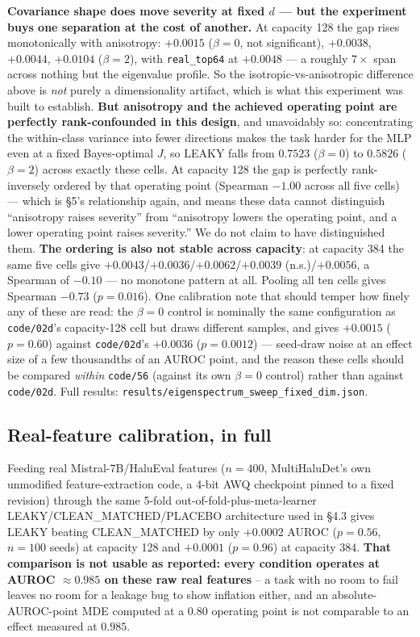 \documentclass[10pt]{article} %
\begin{document}
\textbf{Covariance shape does move severity at fixed $d$ --- but the
experiment buys one separation at the cost of another.} At capacity 128 the
gap rises monotonically with anisotropy: $+0.0015$ ($\beta=0$, not
significant), $+0.0038$, $+0.0044$, $+0.0104$ ($\beta=2$), with
\texttt{real\_top64} at $+0.0048$ --- a roughly $7\times$ span across
nothing but the eigenvalue profile. So the isotropic-vs-anisotropic difference
above is \emph{not} purely a dimensionality artifact, which is what this
experiment was built to establish. \textbf{But anisotropy and the achieved
operating point are perfectly rank-confounded in this design}, and unavoidably
so: concentrating the within-class variance into fewer directions makes the
task harder for the MLP even at a fixed Bayes-optimal $J$, so LEAKY falls from
$0.7523$ ($\beta=0$) to $0.5826$ ($\beta=2$) across exactly these cells. At
capacity 128 the gap is perfectly rank-inversely ordered by that operating
point (Spearman $-1.00$ across all five cells) --- which is §5's relationship
again, and means these data cannot distinguish ``anisotropy raises severity''
from ``anisotropy lowers the operating point, and a lower operating point
raises severity.'' We do not claim to have distinguished them. \textbf{The
ordering is also not stable across capacity}: at capacity 384 the same five
cells give $+0.0043$/$+0.0036$/$+0.0062$/$+0.0039$ (n.s.)/$+0.0056$, a Spearman
of $-0.10$ --- no monotone pattern at all. Pooling all ten cells gives Spearman
$-0.73$ ($p=0.016$). One calibration note that should temper how finely any of
these are read: the $\beta=0$ control is nominally the same configuration as
\texttt{code/02d}'s capacity-128 cell but draws different samples, and gives
$+0.0015$ ($p=0.60$) against \texttt{code/02d}'s $+0.0036$ ($p=0.0012$) --- seed-draw
noise at an effect size of a few thousandths of an AUROC point, and the reason
these cells should be compared \emph{within} \texttt{code/56} (against its own
$\beta=0$ control) rather than against \texttt{code/02d}. Full results:
\texttt{results/eigenspectrum\_sweep\_fixed\_dim.json}.

\subsection{Real-feature calibration, in full}

Feeding real Mistral-7B/HaluEval features ($n=400$, MultiHaluDet's own
unmodified feature-extraction code, a 4-bit AWQ checkpoint pinned to a fixed
revision) through the same 5-fold out-of-fold-plus-meta-learner
LEAKY/CLEAN\_MATCHED/PLACEBO architecture used in §4.3 gives LEAKY beating
CLEAN\_MATCHED by only $+0.0002$ AUROC ($p=0.56$, $n=100$ seeds) at capacity
128 and $+0.0001$ ($p=0.96$) at capacity 384. \textbf{That comparison is not
usable as reported: every condition operates at AUROC $\approx0.985$ on these
raw real features} -- a task with no room to fail leaves no room for a leakage
bug to show inflation either, and an absolute-AUROC-point MDE computed at a
$0.80$ operating point is not comparable to an effect measured at $0.985$.
\end{document}
